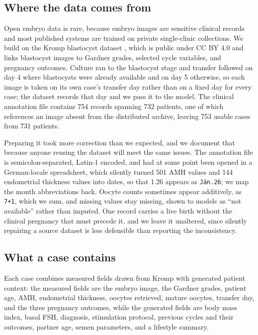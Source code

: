 \documentclass[11pt]{article}
\begin{document}
\subsection{Where the data comes from}

Open embryo data is rare, because embryo images are sensitive clinical records
and most published systems are trained on private single-clinic collections. We
build on the Kromp blastocyst dataset \citep{kromp2023}, which is public under CC
BY 4.0 and links blastocyst images to Gardner grades, selected cycle variables,
and pregnancy outcomes. Culture ran to the blastocyst stage and transfer followed
on day 4 where blastocysts were already available and on day 5 otherwise, so each
image is taken on its own case's transfer day rather than on a fixed day for
every case; the dataset records that day and we pass it to the model. The clinical annotation file contains 754 records spanning 732 patients, one of
which references an image absent from the distributed archive, leaving 753 usable
cases from 731 patients.

Preparing it took more correction than we expected, and we document that because
anyone reusing the dataset will meet the same issues. The annotation file is
semicolon-separated, Latin-1 encoded, and had at some point been opened in a
German-locale spreadsheet, which silently turned 501 AMH values and 144
endometrial thickness values into dates, so that 1.26 appears as
\texttt{J\"an.26}; we map the month abbreviations back. Oocyte counts sometimes
appear additively, as \texttt{7+1}, which we sum, and missing values stay
missing, shown to models as ``not available'' rather than imputed. One record
carries a live birth without the clinical pregnancy that must precede it, and we
leave it unaltered, since silently repairing a source dataset is less defensible
than reporting the inconsistency.

\subsection{What a case contains}

Each case combines measured fields drawn from Kromp with generated patient
context: the measured fields are the embryo image, the Gardner grades, patient
age, AMH, endometrial thickness, oocytes retrieved, mature oocytes, transfer day,
and the three pregnancy outcomes, while the generated fields are body mass index,
basal FSH, diagnosis, stimulation protocol, previous cycles and their outcomes,
partner age, semen parameters, and a lifestyle summary.
\end{document}
